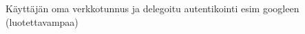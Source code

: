 \documentclass[finnish,gradu]{tktltiki}
\begin{document}
  Käyttäjän oma verkkotunnus ja delegoitu autentikointi esim googleen (luotettavampaa)




\end{document}
